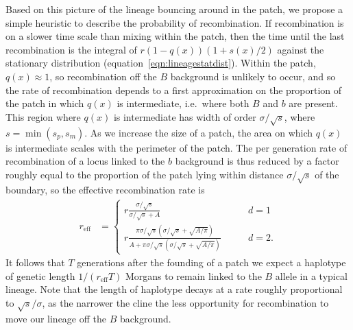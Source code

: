 \documentclass{article}
\newcommand{\plr}[1]{{\it\color{blue}(#1)}}
\begin{document}
Based on this picture of
the lineage bouncing around in the patch,
we propose a simple heuristic to describe the probability of recombination. 
If recombination is on a slower time scale than mixing within the patch,
then the time until the last recombination is the integral of $r (1-q(x)) (1+s(x)/2)$ 
against the stationary distribution (equation~\ref{eqn:lineagestatdist}).
Within the patch, $q(x) \approx 1$,
so recombination off the $B$ background is unlikely to occur,
and so the rate of recombination depends to a first approximation 
on the proportion of the patch in which $q(x)$ is intermediate,
i.e.\ where both $B$ and $b$ are present.
This region where $q(x)$ is intermediate has width of order $\sigma/\sqrt{s}$, where $s = \min(s_p,s_m)$.
As we increase the size of a patch, the area on which $q(x)$ is intermediate scales with the perimeter of the patch.
The per generation rate of recombination of a locus linked to the $b$ background is thus
reduced by a factor roughly equal to the proportion of the patch lying within distance $\sigma/\sqrt{s}$ of the boundary,
so the effective recombination rate is
\begin{align}
r_\text{eff} &=
    \begin{cases}
    r \frac{ \sigma /\sqrt{s} }{ \sigma/\sqrt{s} + A }    \qquad & d=1 \\
   r \frac{\pi  \sigma /\sqrt{s}  \left( \sigma /\sqrt{s}+
  \sqrt{A/\pi} \right)}{A+\pi \sigma/\sqrt{s} \left( \sigma/\sqrt{s} +
  \sqrt{A/\pi} \right) }    \qquad & d=2 .
\end{cases}
\label{eqn:rec_rate_within}   %
\end{align}
It follows that $T$ generations after the founding of a patch we expect a
haplotype of genetic length $1/(r_\text{eff}T)$ Morgans to remain linked to
the $B$ allele in a typical lineage. 
Note that the length of haplotype
decays at a rate roughly proportional to $\sqrt{s}/ \sigma$, as the narrower the cline 
the less opportunity for recombination to move our lineage off the $B$ background. 
 
\end{document}
